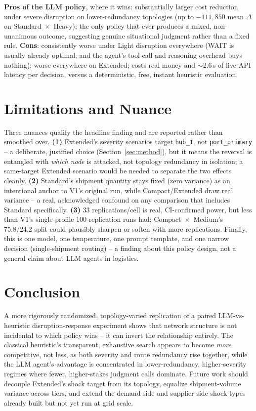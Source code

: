 \documentclass[10pt,twocolumn]{article}
\begin{document}
\textbf{Pros of the LLM policy}, where it wins: substantially larger cost reduction under severe disruption on lower-redundancy topologies (up to $-111{,}850$ mean $\Delta$ on Standard~$\times$~Heavy); the only policy that ever produces a mixed, non-unanimous outcome, suggesting genuine situational judgment rather than a fixed rule.
\textbf{Cons}: consistently worse under Light disruption everywhere (WAIT is usually already optimal, and the agent's tool-call and reasoning overhead buys nothing); worse everywhere on Extended; costs real money and $\sim$2.6\,s of live-API latency per decision, versus a deterministic, free, instant heuristic evaluation.

\section{Limitations and Nuance}
\label{sec:limits}
Three nuances qualify the headline finding and are reported rather than smoothed over. \textbf{(1)} Extended's severity scenarios target \texttt{hub\_1}, not \texttt{port\_primary} -- a deliberate, justified choice (Section~\ref{sec:method}), but it means the reversal is entangled with \emph{which node} is attacked, not topology redundancy in isolation; a same-target Extended scenario would be needed to separate the two effects cleanly. \textbf{(2)} Standard's shipment quantity stays fixed (zero variance) as an intentional anchor to V1's original run, while Compact/Extended draw real variance -- a real, acknowledged confound on any comparison that includes Standard specifically. \textbf{(3)} 33 replications/cell is real, CI-confirmed power, but less than V1's single-profile 100-replication runs had; Compact~$\times$~Medium's 75.8/24.2 split could plausibly sharpen or soften with more replications. Finally, this is one model, one temperature, one prompt template, and one narrow decision (single-shipment routing) -- a finding about this policy design, not a general claim about LLM agents in logistics.

\section{Conclusion}
A more rigorously randomized, topology-varied replication of a paired LLM-vs-heuristic disruption-response experiment shows that network structure is not incidental to which policy wins -- it can invert the relationship entirely. The classical heuristic's transparent, exhaustive search appears to become \emph{more} competitive, not less, as both severity and route redundancy rise together, while the LLM agent's advantage is concentrated in lower-redundancy, higher-severity regimes where fewer, higher-stakes judgment calls dominate. Future work should decouple Extended's shock target from its topology, equalize shipment-volume variance across tiers, and extend the demand-side and supplier-side shock types already built but not yet run at grid scale.
\end{document}
